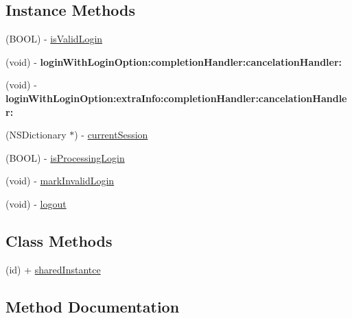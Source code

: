 \subsection*{Instance Methods}
\begin{DoxyCompactItemize}
\item 
(B\+O\+OL) -\/ \mbox{\hyperlink{protocol_mtop_login_protocol_01-p_a96dd71df504db90522a1045402cd8b61}{is\+Valid\+Login}}
\item 
\mbox{\label{protocol_mtop_login_protocol_01-p_a0d787d772d5e8983d9ca727934dbc500}} 
(void) -\/ {\bfseries login\+With\+Login\+Option\+:completion\+Handler\+:cancelation\+Handler\+:}
\item 
\mbox{\label{protocol_mtop_login_protocol_01-p_a2729c2423a4b2852104ffe46733eddaf}} 
(void) -\/ {\bfseries login\+With\+Login\+Option\+:extra\+Info\+:completion\+Handler\+:cancelation\+Handler\+:}
\item 
(N\+S\+Dictionary $\ast$) -\/ \mbox{\hyperlink{protocol_mtop_login_protocol_01-p_a52b7b9f65a9bb55a7246de9bc2904d1a}{current\+Session}}
\item 
(B\+O\+OL) -\/ \mbox{\hyperlink{protocol_mtop_login_protocol_01-p_afc9803feb43aa60bd2e1fb8fec043e1a}{is\+Processing\+Login}}
\item 
(void) -\/ \mbox{\hyperlink{protocol_mtop_login_protocol_01-p_aa7126056122d52ded68c8fc843799ef3}{mark\+Invalid\+Login}}
\item 
(void) -\/ \mbox{\hyperlink{protocol_mtop_login_protocol_01-p_ac22bf1c113294b7aba4c1f1e92445e4e}{logout}}
\end{DoxyCompactItemize}
\subsection*{Class Methods}
\begin{DoxyCompactItemize}
\item 
(id) + \mbox{\hyperlink{protocol_mtop_login_protocol_01-p_a64172bdbfef566337b9daa18c6140457}{shared\+Instantce}}
\end{DoxyCompactItemize}


\subsection{Method Documentation}
\mbox{\label{protocol_mtop_login_protocol_01-p_a52b7b9f65a9bb55a7246de9bc2904d1a}} 
